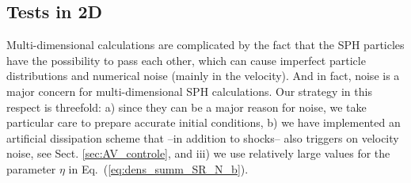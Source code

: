 \documentclass{elsart}
\begin{document}
\subsection{Tests in 2D}
Multi-dimensional calculations are complicated by the fact that the SPH particles have the
possibility to pass each other, which can cause imperfect particle distributions and numerical noise
(mainly in the velocity). And in fact, noise is a major concern for multi-dimensional SPH calculations. 
Our strategy in this respect is threefold: a) since they can be a major reason for noise, we take particular 
care to prepare accurate initial conditions, b) we have implemented an artificial dissipation 
scheme  that --in addition to shocks-- also triggers on velocity noise, see Sect. \ref{sec:AV_controle}, and iii)
we use relatively large values for the parameter $\eta$ in Eq.~(\ref{eq:dens_summ_SR_N_b}).\\
\end{document}
